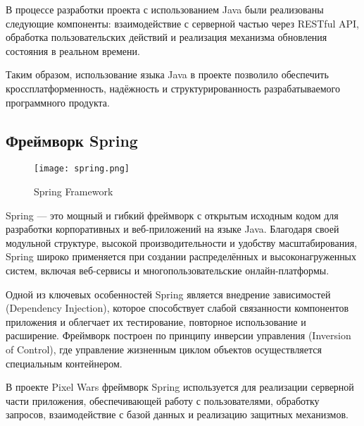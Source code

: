 В процессе разработки проекта с использованием Java были реализованы следующие компоненты: взаимодействие с серверной частью через RESTful API, обработка пользовательских действий и реализация механизма обновления состояния в реальном времени.

Таким образом, использование языка Java в проекте позволило обеспечить кроссплатформенность, надёжность и структурированность разрабатываемого программного продукта.

\subsection{Фреймворк Spring}

\begin{figure}[H]
    \centering
    \texttt{[image: spring.png]}
    \caption{Spring Framework}
\end{figure}

Spring --- это мощный и гибкий фреймворк с открытым исходным кодом для разработки корпоративных и веб-приложений на языке Java. Благодаря своей модульной структуре, высокой производительности и удобству масштабирования, Spring широко применяется при создании распределённых и высоконагруженных систем, включая веб-сервисы и многопользовательские онлайн-платформы.

Одной из ключевых особенностей Spring является внедрение зависимостей (Dependency Injection), которое способствует слабой связанности компонентов приложения и облегчает их тестирование, повторное использование и расширение. Фреймворк построен по принципу инверсии управления (Inversion of Control), где управление жизненным циклом объектов осуществляется специальным контейнером.

В проекте Pixel Wars фреймворк Spring используется для реализации серверной части приложения, обеспечивающей работу с пользователями, обработку запросов, взаимодействие с базой данных и реализацию защитных механизмов.

